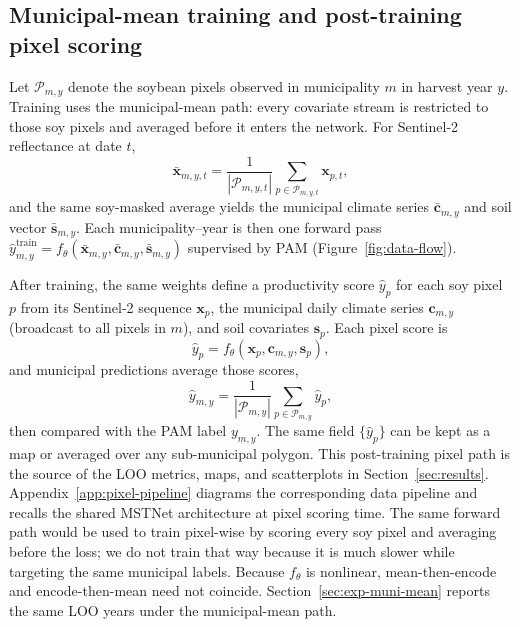 \subsection{Municipal-mean training and post-training pixel scoring}
\label{sec:pixel-formulation}
Let $\mathcal{P}_{m,y}$ denote the soybean pixels observed in municipality $m$ in harvest year $y$.
Training uses the municipal-mean path: every covariate stream is restricted to those soy pixels and averaged before it enters the network.
For Sentinel-2 reflectance at date $t$,
\begin{equation}
  \bar{\mathbf{x}}_{m,y,t}
  =
  \frac{1}{|\mathcal{P}_{m,y,t}|}
  \sum_{p \in \mathcal{P}_{m,y,t}}\mathbf{x}_{p,t},
  \label{eq:municipal-mean}
\end{equation}
and the same soy-masked average yields the municipal climate series $\bar{\mathbf{c}}_{m,y}$ and soil vector $\bar{\mathbf{s}}_{m,y}$.
Each municipality--year is then one forward pass
$\hat{y}_{m,y}^{\mathrm{train}}=f_\theta(\bar{\mathbf{x}}_{m,y},\bar{\mathbf{c}}_{m,y},\bar{\mathbf{s}}_{m,y})$
supervised by PAM (Figure~\ref{fig:data-flow}).

After training, the same weights define a productivity score $\hat{y}_p$ for each soy pixel $p$ from its Sentinel-2 sequence $\mathbf{x}_p$, the municipal daily climate series $\mathbf{c}_{m,y}$ (broadcast to all pixels in $m$), and soil covariates $\mathbf{s}_p$.
Each pixel score is
\begin{equation}
  \hat{y}_p = f_\theta(\mathbf{x}_p, \mathbf{c}_{m,y}, \mathbf{s}_p),
  \label{eq:pixel-score}
\end{equation}
and municipal predictions average those scores,
\begin{equation}
  \hat{y}_{m,y}
  =
  \frac{1}{|\mathcal{P}_{m,y}|}
  \sum_{p \in \mathcal{P}_{m,y}}
  \hat{y}_p ,
  \label{eq:pixel-mean-agg}
\end{equation}
then compared with the PAM label $y_{m,y}$.
The same field $\{\hat{y}_p\}$ can be kept as a map or averaged over any sub-municipal polygon.
This post-training pixel path is the source of the LOO metrics, maps, and scatterplots in Section~\ref{sec:results}.
Appendix~\ref{app:pixel-pipeline} diagrams the corresponding data pipeline and recalls the shared MSTNet architecture at pixel scoring time.
The same forward path would be used to train pixel-wise by scoring every soy pixel and averaging before the loss; we do not train that way because it is much slower while targeting the same municipal labels.
Because $f_\theta$ is nonlinear, mean-then-encode and encode-then-mean need not coincide.
Section~\ref{sec:exp-muni-mean} reports the same LOO years under the municipal-mean path.

